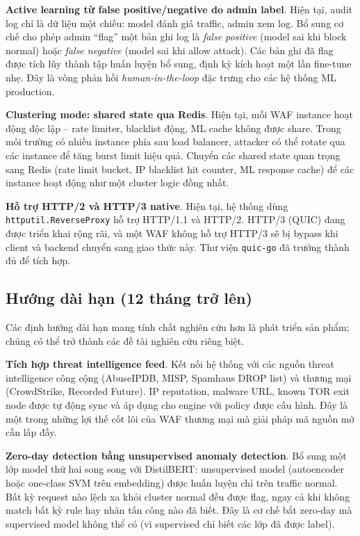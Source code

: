 \documentclass[../DoAn.tex]{subfiles}
\begin{document}
\textbf{Active learning từ false positive/negative do admin label}. Hiện
tại, audit log chỉ là dữ liệu một chiều: model đánh giá traffic, admin
xem log. Bổ sung cơ chế cho phép admin ``flag'' một bản ghi log là
\textit{false positive} (model sai khi block normal) hoặc \textit{false
negative} (model sai khi allow attack). Các bản ghi đã flag được tích lũy
thành tập huấn luyện bổ sung, định kỳ kích hoạt một lần fine-tune nhẹ.
Đây là vòng phản hồi \textit{human-in-the-loop} đặc trưng cho các hệ
thống ML production.

\textbf{Clustering mode: shared state qua Redis}. Hiện tại, mỗi WAF instance
hoạt động độc lập -- rate limiter, blacklist động, ML cache không được
share. Trong môi trường có nhiều instance phía sau load balancer, attacker
có thể rotate qua các instance để tăng burst limit hiệu quả. Chuyển các
shared state quan trọng sang Redis (rate limit bucket, IP blacklist hit
counter, ML response cache) để các instance hoạt động như một cluster
logic đồng nhất.

\textbf{Hỗ trợ HTTP/2 và HTTP/3 native}. Hiện tại, hệ thống dùng
\texttt{httputil.ReverseProxy} hỗ trợ HTTP/1.1 và HTTP/2. HTTP/3 (QUIC)
đang được triển khai rộng rãi, và một WAF không hỗ trợ HTTP/3 sẽ bị bypass
khi client và backend chuyển sang giao thức này. Thư viện
\texttt{quic-go} đã trưởng thành đủ để tích hợp.

\subsection{Hướng dài hạn (12 tháng trở lên)}
\label{subsection:6.2.3}

Các định hướng dài hạn mang tính chất nghiên cứu hơn là phát triển sản
phẩm; chúng có thể trở thành các đề tài nghiên cứu riêng biệt.

\textbf{Tích hợp threat intelligence feed}. Kết nối hệ thống với các nguồn
threat intelligence công cộng (AbuseIPDB, MISP, Spamhaus DROP list) và
thương mại (CrowdStrike, Recorded Future). IP reputation, malware URL,
known TOR exit node được tự động sync và áp dụng cho engine với policy
được cấu hình. Đây là một trong những lợi thế cốt lõi của WAF thương mại
mà giải pháp mã nguồn mở cần lấp đầy.

\textbf{Zero-day detection bằng unsupervised anomaly detection}. Bổ sung
một lớp model thứ hai song song với DistilBERT: unsupervised model
(autoencoder hoặc one-class SVM trên embedding) được huấn luyện chỉ trên
traffic normal. Bất kỳ request nào lệch xa khỏi cluster normal đều được
flag, ngay cả khi không match bất kỳ rule hay nhãn tấn công nào đã biết.
Đây là cơ chế bắt zero-day mà supervised model không thể có (vì supervised
chỉ biết các lớp đã được label).
\end{document}
